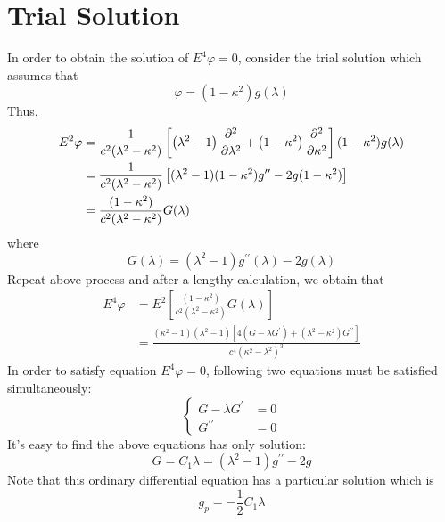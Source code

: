 \documentclass[fontsize=11pt, %
                             paper=a4, %
                             twoside, %
                             captions=tableheading,
                             index=totoc,
                             hyperref]{labbook}
\begin{document}
\section{Trial Solution}
In order to obtain the solution of $E^4\varphi=0$, consider the trial solution which assumes that
\begin{equation}
\varphi=(1-\kappa^2)g(\lambda)
\end{equation}
Thus,
\begin{equation}
\begin{aligned}
E^2\varphi&=\frac{1}{c^2(\lambda^2-\kappa^2)}\left[\left(\lambda^2-1\right)\frac{\partial^2 }{\partial \lambda^2}+\left(1-\kappa^2\right)\frac{\partial^2 }{\partial \kappa^2}\right](1-\kappa^2)g(\lambda)\\
&=\frac{1}{c^2(\lambda^2-\kappa^2)}\left[(\lambda^2-1)(1-\kappa^2)g^{\prime\prime}-2g(1-\kappa^2)\right]\\
&=\frac{(1-\kappa^2)}{c^2(\lambda^2-\kappa^2)}G(\lambda)
\end{aligned}
\end{equation}
where
\begin{equation}
G(\lambda)=(\lambda^2-1)g^{\prime\prime}(\lambda)-2g(\lambda)
\end{equation}
Repeat above process and after a lengthy calculation, we obtain that
\begin{equation}
\begin{aligned}
E^4\varphi&=E^2\left[\frac{(1-\kappa^2)}{c^2(\lambda^2-\kappa^2)}G(\lambda)\right]\\
&=\frac{(\kappa^2-1)(\lambda^2-1)\left[4(G-\lambda G^\prime)+(\lambda^2-\kappa^2)G^{\prime\prime}\right]}{c^4(\kappa^2-\lambda^2)^3}
\end{aligned}
\end{equation}
In order to satisfy equation $E^4\varphi=0$, following two equations must be satisfied simultaneously:
\begin{equation}
\left\{
\begin{aligned}
G-\lambda G^\prime&=0\\
G^{\prime\prime}&=0
\end{aligned}
\right.
\end{equation}
It's easy to find the above equations has only solution:
\begin{equation}\label{eqn-lambdapart}
G=C_1\lambda=(\lambda^2-1)g^{\prime\prime}-2g
\end{equation}
Note that this ordinary differential equation has a particular solution which is
\begin{equation}
g_{p}=-\frac{1}{2}C_1\lambda
\end{equation}
\end{document}
